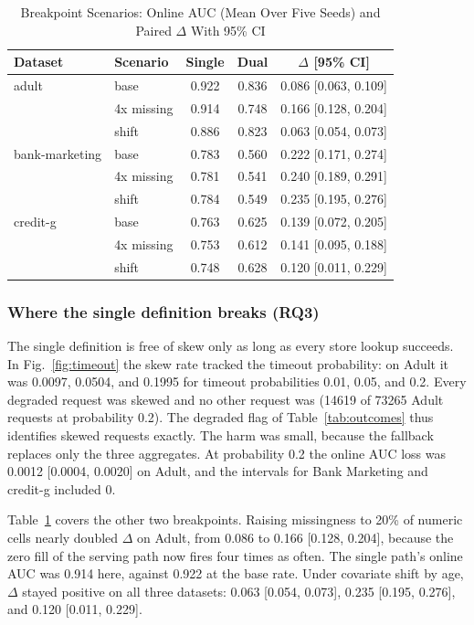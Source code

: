 \documentclass[journal]{IEEEtran}
\begin{document}
\begin{table}[!t]
\caption{Breakpoint Scenarios: Online AUC (Mean Over Five Seeds) and Paired $\Delta$ With 95\% CI}
\label{tab:breakpoints}
\centering
\footnotesize
\setlength{\tabcolsep}{2.5pt}
\begin{tabular}{@{}llccc@{}}
\toprule
Dataset & Scenario & Single & Dual & $\Delta$ [95\% CI] \\
\midrule
adult & base & 0.922 & 0.836 & 0.086 [0.063, 0.109] \\
 & 4x missing & 0.914 & 0.748 & 0.166 [0.128, 0.204] \\
 & shift & 0.886 & 0.823 & 0.063 [0.054, 0.073] \\
\midrule
bank-marketing & base & 0.783 & 0.560 & 0.222 [0.171, 0.274] \\
 & 4x missing & 0.781 & 0.541 & 0.240 [0.189, 0.291] \\
 & shift & 0.784 & 0.549 & 0.235 [0.195, 0.276] \\
\midrule
credit-g & base & 0.763 & 0.625 & 0.139 [0.072, 0.205] \\
 & 4x missing & 0.753 & 0.612 & 0.141 [0.095, 0.188] \\
 & shift & 0.748 & 0.628 & 0.120 [0.011, 0.229] \\
\bottomrule
\end{tabular}
\end{table}

\subsubsection{Where the single definition breaks (RQ3)}
The single definition is free of skew only as long as every store lookup succeeds. In Fig.~\ref{fig:timeout} the skew rate tracked the timeout probability: on Adult it was 0.0097, 0.0504, and 0.1995 for timeout probabilities 0.01, 0.05, and 0.2. Every degraded request was skewed and no other request was (14619 of 73265 Adult requests at probability 0.2). The degraded flag of Table~\ref{tab:outcomes} thus identifies skewed requests exactly. The harm was small, because the fallback replaces only the three aggregates. At probability 0.2 the online AUC loss was 0.0012 [0.0004, 0.0020] on Adult, and the intervals for Bank Marketing and credit-g included 0.

Table~\ref{tab:breakpoints} covers the other two breakpoints. Raising missingness to 20\% of numeric cells nearly doubled $\Delta$ on Adult, from 0.086 to 0.166 [0.128, 0.204], because the zero fill of the serving path now fires four times as often. The single path's online AUC was 0.914 here, against 0.922 at the base rate. Under covariate shift by age, $\Delta$ stayed positive on all three datasets: 0.063 [0.054, 0.073], 0.235 [0.195, 0.276], and 0.120 [0.011, 0.229].
\end{document}
